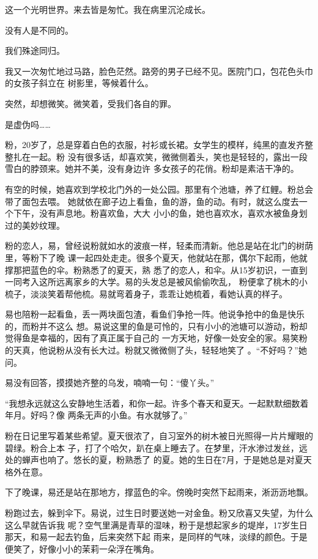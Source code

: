 \documentclass[12pt,a4paper]{article}
\begin{document}
		这一个光明世界。来去皆是匆忙。我在病里沉沦成长。

		没有人是不同的。

		我们殊途同归。

		我又一次匆忙地过马路，脸色茫然。路旁的男子已经不见。医院门口，包花色头巾的女孩子斜立在
	树影里，等候着什么。

		突然，却想微笑。微笑着，受我们各自的罪。

		是虚伪吗……

	\endwriting



		粉，20岁了，总是穿着白色的衣服，衬衫或长裙。女学生的模样，纯黑的直发齐整整扎在一起。粉
	没有很多话，却喜欢笑，微微侧着头，笑也是轻轻的，露出一段雪白的脖颈来。她并不美，没有身边许
	多女孩子的花俏。粉却是素洁干净的。

		有空的时候，她喜欢到学校北门外的一处公园。那里有个池塘，养了红鲤。粉总会带了面包去喂。
	她就依在廊子边上看鱼，鱼的游，鱼的动。有时，就这么度去一个下午，没有声息地。粉喜欢鱼，大大
	小小的鱼，她也喜欢水，喜欢水被鱼身划过的美妙纹理。

		粉的恋人，易，曾经说粉就如水的波痕一样，轻柔而清新。他总是站在北门的树荫里，等粉下了晚
	课一起四处走走。很多个夏天，他就站在那，偶尔下起雨，他就撑那把蓝色的伞。粉熟悉了的夏天，熟
	悉了的恋人，和伞。从15岁初识，一直到一同考入这所远离家乡的大学。易的头发总是被风偷偷吹乱，
	粉便拿了桃木的小梳子，淡淡笑着帮他梳。易就弯着身子，乖乖让她梳着，看她认真的样子。

		易也陪粉一起看鱼，丢一两块面包渣，看鱼们争抢一阵。他说争抢中的鱼是快乐的，而粉并不这么
	想。易说这里的鱼是可怜的，只有小小的池塘可以游动，粉却觉得鱼是幸福的，因有了真正属于自己的
	一方天地，好像一处安全的家。易笑粉的天真，他说粉从没有长大过。粉就又微微侧了头，轻轻地笑了
	。“不好吗？”她问。

		易没有回答，摸摸她齐整的乌发，喃喃一句：“傻丫头。”

		“我想永远就这么安静地生活着，和你一起。许多个春天和夏天。一起默默细数着年月。好吗？像
	两条无声的小鱼。有水就够了。”

		粉在日记里写着某些希望。夏天很浓了，自习室外的树木被日光照得一片片耀眼的碧绿。粉合上本
	子，打了个哈欠，趴在桌上睡去了。在梦里，汗水渗过发丝，远处的蝉声也响了。悠长的夏，粉熟悉了
	的夏。她的生日在7月，于是她总是对夏天格外在意。

		下了晚课，易还是站在那地方，撑蓝色的伞。傍晚时突然下起雨来，淅沥沥地飘。

		粉跑过去，躲到伞下。易说，过生日时要送她一对金鱼。粉又欣喜又失望，为什么这么早就告诉我
	呢？空气里满是青草的湿味，粉于是想起家乡的堤岸，17岁生日那天，和易一起去钓鱼，后来突然下起
	雨来，是同样的气味，淡绿的颜色。于是便笑了，好像小小的茉莉一朵浮在嘴角。
\end{document}

